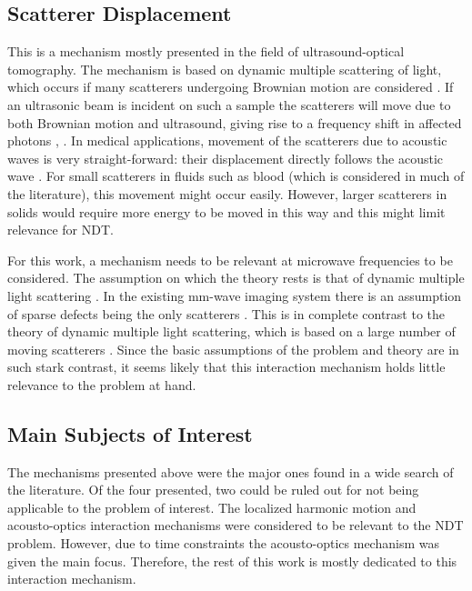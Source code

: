 \documentclass[11pt,twoside]{eitExjobb}
\begin{document}
	\subsection{Scatterer Displacement}
	This is a mechanism mostly presented in the field of ultrasound-optical tomography. The mechanism is based on dynamic multiple scattering of light, which occurs if many scatterers undergoing Brownian motion are considered \cite{Leutz1995}. If an ultrasonic beam is incident on such a sample the scatterers will move due to both Brownian motion and ultrasound, giving rise to a frequency shift in affected photons \cite{Leutz1995}, \cite{Elson2011}. In medical applications, movement of the scatterers due to acoustic waves is very straight-forward: their displacement directly follows the acoustic wave \cite{Leutz1995}. For small scatterers in fluids such as blood (which is considered in much of the literature), this movement might occur easily. However, larger scatterers in solids would require more energy to be moved in this way and this might limit relevance for NDT.
	
	For this work, a mechanism needs to be relevant at microwave frequencies to be considered. The assumption on which the theory rests is that of dynamic multiple light scattering \cite{Leutz1995}. In the existing mm-wave imaging system there is an assumption of sparse defects being the only scatterers \cite{Helander2017}. This is in complete contrast to the theory of dynamic multiple light scattering, which is based on a large number of moving scatterers \cite{Leutz1995}. Since the basic assumptions of the problem and theory are in such stark contrast, it seems likely that this interaction mechanism holds little relevance to the problem at hand.
	
	\subsection{Main Subjects of Interest}
	The mechanisms presented above were the major ones found in a wide search of the literature. Of the four presented, two could be ruled out for not being applicable to the problem of interest. The localized harmonic motion and acousto-optics interaction mechanisms were considered to be relevant to the NDT problem. However, due to time constraints the acousto-optics mechanism was given the main focus. Therefore, the rest of this work is mostly dedicated to this interaction mechanism.
	
\end{document}
